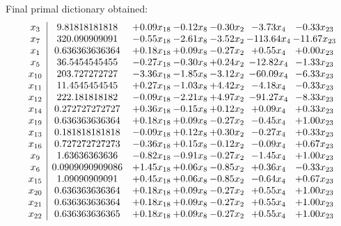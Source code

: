 \documentclass[8pt]{article}
\begin{document}
 Final primal dictionary obtained: 
\[\begin{array}{c| c c@{\hskip 2pt} c@{\hskip 2pt} c@{\hskip 2pt} c@{\hskip 2pt} c@{\hskip 2pt} }
 x_{3}   &  9.81818181818 & +  0.09 x_{18} & -0.12 x_{8} & -0.30 x_{2} & -3.73 x_{4} & -0.33 x_{23}\\
 x_{7}   &  320.090909091 & -0.55 x_{18} & -2.61 x_{8} & -3.52 x_{2} & -113.64 x_{4} & -11.67 x_{23}\\
 x_{1}   &  0.636363636364 & +  0.18 x_{18} & +  0.09 x_{8} & -0.27 x_{2} & +  0.55 x_{4} & +  0.00 x_{23}\\
 x_{5}   &  36.5454545455 & -0.27 x_{18} & -0.30 x_{8} & +  0.24 x_{2} & -12.82 x_{4} & -1.33 x_{23}\\
 x_{10}   &  203.727272727 & -3.36 x_{18} & -1.85 x_{8} & -3.12 x_{2} & -60.09 x_{4} & -6.33 x_{23}\\
 x_{11}   &  11.4545454545 & +  0.27 x_{18} & -1.03 x_{8} & +  4.42 x_{2} & -4.18 x_{4} & -0.33 x_{23}\\
 x_{12}   &  222.181818182 & -0.09 x_{18} & -2.21 x_{8} & +  4.97 x_{2} & -91.27 x_{4} & -8.33 x_{23}\\
 x_{14}   &  0.272727272727 & +  0.36 x_{18} & -0.15 x_{8} & +  0.12 x_{2} & +  0.09 x_{4} & +  0.33 x_{23}\\
 x_{19}   &  0.636363636364 & +  0.18 x_{18} & +  0.09 x_{8} & -0.27 x_{2} & -0.45 x_{4} & +  1.00 x_{23}\\
 x_{13}   &  0.181818181818 & -0.09 x_{18} & +  0.12 x_{8} & +  0.30 x_{2} & -0.27 x_{4} & +  0.33 x_{23}\\
 x_{16}   &  0.727272727273 & -0.36 x_{18} & +  0.15 x_{8} & -0.12 x_{2} & -0.09 x_{4} & +  0.67 x_{23}\\
 x_{9}   &  1.63636363636 & -0.82 x_{18} & -0.91 x_{8} & -0.27 x_{2} & -1.45 x_{4} & +  1.00 x_{23}\\
 x_{6}   &  0.0909090909086 & +  1.45 x_{18} & +  0.06 x_{8} & -0.85 x_{2} & +  0.36 x_{4} & -0.33 x_{23}\\
 x_{15}   &  1.09090909091 & +  0.45 x_{18} & +  0.06 x_{8} & -0.85 x_{2} & -0.64 x_{4} & +  0.67 x_{23}\\
 x_{20}   &  0.636363636364 & +  0.18 x_{18} & +  0.09 x_{8} & -0.27 x_{2} & +  0.55 x_{4} & +  1.00 x_{23}\\
 x_{21}   &  0.636363636364 & +  0.18 x_{18} & +  0.09 x_{8} & -0.27 x_{2} & +  0.55 x_{4} & +  1.00 x_{23}\\
 x_{22}   &  0.636363636365 & +  0.18 x_{18} & +  0.09 x_{8} & -0.27 x_{2} & +  0.55 x_{4} & +  1.00 x_{23}\\

\end{array}\]
\end{document}
